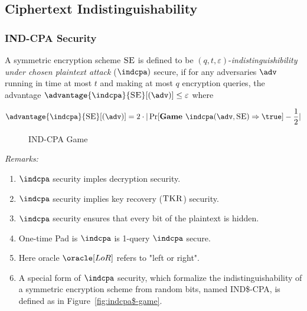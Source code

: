 \documentclass[11pt,a4paper]{article}
\newcommand{\SE}{\textsc{SE}}
\begin{document}
\subsection{Ciphertext Indistinguishability}
\subsubsection{IND-CPA Security}
A symmetric encryption scheme  $\SE$ is defined to be $(q,t,\varepsilon)$-\textit{indistinguishibility under chosen plaintext attack} ($\indcpa)$ secure, if for any adversaries $\adv$ running in time at most $t$ and making at most $q$ encryption queries, the advantage $\advantage{\indcpa}{\SE}[(\adv)] \leq \varepsilon$ where 

$$
\advantage{\indcpa}{\SE}[(\adv)] = 2 \cdot | \Pr[\textbf{Game } \indcpa(\adv, \SE) \Rightarrow \true ] - \frac{1}{2} | 
$$ 


\begin{figure}[H]
\begin{pchstack}[ center , boxed, space=0.5cm]
\procedure[linenumbering]{$\textbf{Game }\indcpa(\adv, \SE)$}{ 
b \sample \bin \\
K \sample \kgen(1^\lambda) \\ 
b' \sample \adv^{\oracle[LoR] }() \\
\pcreturn b'= b
 }

\end{pchstack}
\caption{IND-CPA Game}
\label{fig:indcpa-game}
\end{figure}

\bigskip 
\textit{Remarks:}
\begin{enumerate}
	\item $\indcpa$ security imples decryption security.
	\item $\indcpa$ security implies key recovery ($\textsc{TKR}$) security.
	\item $\indcpa$ security ensures that every bit of the plaintext is hidden. 
	\item One-time Pad is $\indcpa$ is 1-query $\indcpa$ secure. 
	\item Here oracle $\oracle[LoR]$ refers to "left or right". 
	\item A special form of $\indcpa$ security, which formalize the indistinguishability of a symmetric encryption scheme from random bits, named IND\$-CPA, is defined as in Figure~\ref{fig:indcpa$-game}. 
\end{enumerate}
\end{document}
